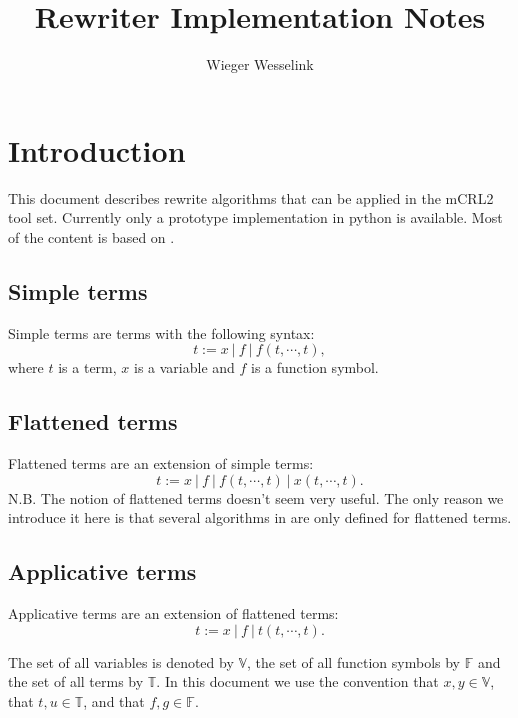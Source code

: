 \documentclass{article}
\begin{document}
\title{Rewriter Implementation Notes}
\author{Wieger Wesselink}
\maketitle

\section{Introduction}

This document describes rewrite algorithms that can be applied in the mCRL2
tool set. Currently only a prototype implementation in python is available.
Most of the content is based on \cite{weerdenburg2009}.

\subsection{Simple terms}

Simple terms are terms with the following syntax:%
\begin{equation}
t:=x\ |\ f\ |\ f(t,\cdots ,t),  \label{eq:simple_terms}
\end{equation}%
where $t$ is a term, $x$ is a variable and $f$ is a function symbol.

\subsection{Flattened terms}

Flattened terms are an extension of simple terms:%
\begin{equation}
t:=x\ |\ f\ |\ f(t,\cdots ,t)\ |\ x(t,\cdots ,t).  \label{eq:flattened_terms}
\end{equation}%
N.B. The notion of flattened terms doesn't seem very useful. The only reason
we introduce it here is that several algorithms in \cite{weerdenburg2009}
are only defined for flattened terms.

\subsection{Applicative terms}

Applicative terms are an extension of flattened terms:%
\begin{equation}
t:=x\ |\ f\ |\ t(t,\cdots ,t).  \label{eq:applicative_terms}
\end{equation}

The set of all variables is denoted by $\mathbb{V}$, the set of all function
symbols by $\mathbb{F}$ and the set of all terms by $\mathbb{T}$. In this
document we use the convention that $x,y\in \mathbb{V}$, that $t,u\in 
\mathbb{T}$, and that $f,g\in \mathbb{F}$.
\end{document}
